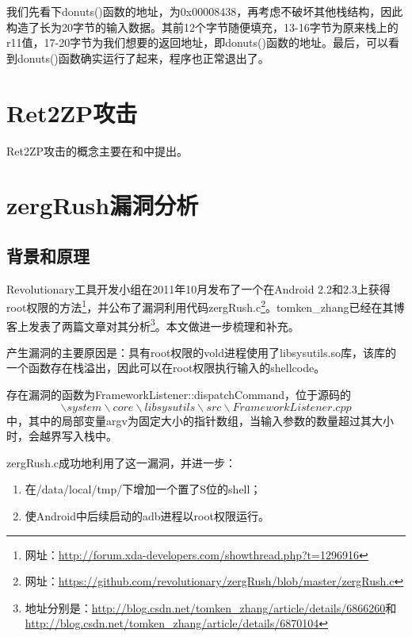 

我们先看下donuts()函数的地址，为0x00008438，再考虑不破坏其他栈结构，因此构造了长为20字节的输入数据。其前12个字节随便填充，13-16字节为原来栈上的r11值，17-20字节为我们想要的返回地址，即donuts()函数的地址。最后，可以看到donuts()函数确实运行了起来，程序也正常退出了。

\section{Ret2ZP攻击}
Ret2ZP攻击的概念主要在\cite{arm_stack_exploitation}和\cite{arm_exploitation}中提出。
\section{zergRush漏洞分析}
\subsection{背景和原理}
Revolutionary工具开发小组在2011年10月发布了一个在Android 2.2和2.3上获得root权限的方法\footnote{网址：\href{http://forum.xda-developers.com/showthread.php?t=1296916}{http://forum.xda-developers.com/showthread.php?t=1296916}}，并公布了漏洞利用代码zergRush.c\footnote{网址：\href{https://github.com/revolutionary/zergRush/blob/master/zergRush.c}{https://github.com/revolutionary/zergRush/blob/master/zergRush.c}}。tomken\_zhang已经在其博客上发表了两篇文章对其分析\footnote{地址分别是：\href{http://blog.csdn.net/tomken\_zhang/article/details/6866260}{http://blog.csdn.net/tomken\_zhang/article/details/6866260}和\href{http://blog.csdn.net/tomken\_zhang/article/details/6870104}{http://blog.csdn.net/tomken\_zhang/article/details/6870104}}。本文做进一步梳理和补充。

产生漏洞的主要原因是：具有root权限的vold进程使用了libsysutils.so库，该库的一个函数存在栈溢出，因此可以在root权限执行输入的shellcode。

存在漏洞的函数为FrameworkListener::dispatchCommand，位于源码的$$\backslash system\backslash core\backslash libsysutils\backslash src\backslash FrameworkListener.cpp$$中，其中的局部变量argv为固定大小的指针数组，当输入参数的数量超过其大小时，会越界写入栈中。

zergRush.c成功地利用了这一漏洞，并进一步：
\begin{enumerate}
\item 在/data/local/tmp/下增加一个置了S位的shell；
\item 使Android中后续启动的adb进程以root权限运行。
\end{enumerate}

